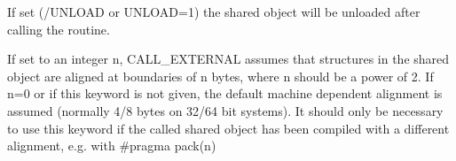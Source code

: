 %
If set (/UNLOAD or UNLOAD=1) the shared object will be unloaded after calling the routine.

If set to an integer n, CALL\_EXTERNAL assumes that structures in the shared object 
are aligned at boundaries of n bytes, where n should be a power of 2.
If n=0 or if this keyword is not given, the default machine 
dependent alignment is assumed (normally 4/8 bytes on 32/64 bit systems). 
It should only be necessary to use this keyword if the 
called shared object has been compiled with a different 
alignment, e.g. with \#pragma pack(n)

